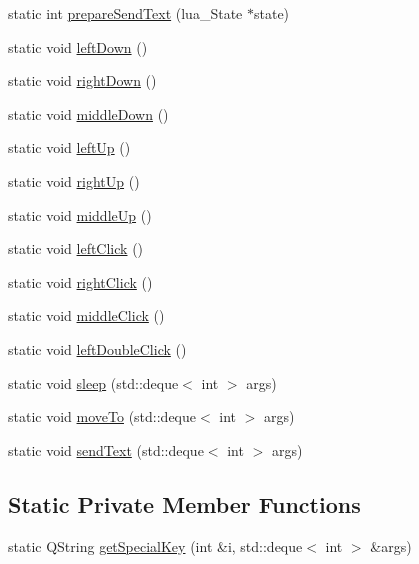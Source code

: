 \begin{DoxyCompactItemize}
\item 
static int \hyperlink{class_lua_api_engine_a8f327b5c6d5819c9078b53a665842c47}{prepare\-Send\-Text} (lua\-\_\-\-State $\ast$state)
\item 
static void \hyperlink{class_lua_api_engine_a5942498f999031601960d890b259536b}{left\-Down} ()
\item 
static void \hyperlink{class_lua_api_engine_a14df77fdabe3ddf5dd19c35e70acb2d8}{right\-Down} ()
\item 
static void \hyperlink{class_lua_api_engine_abea870a5edb171b0bc2345dd1e1e7b95}{middle\-Down} ()
\item 
static void \hyperlink{class_lua_api_engine_a926f72169c400bb32186737f03208e1c}{left\-Up} ()
\item 
static void \hyperlink{class_lua_api_engine_ae8b09733792cc95ca22654be8074bfbf}{right\-Up} ()
\item 
static void \hyperlink{class_lua_api_engine_a2cd4a53a99e262aa9d5e83a2b34b6538}{middle\-Up} ()
\item 
static void \hyperlink{class_lua_api_engine_ae857b39d951f50a206989c3422cb5494}{left\-Click} ()
\item 
static void \hyperlink{class_lua_api_engine_a7b3664b6f2593d3bd817edeee61a18e6}{right\-Click} ()
\item 
static void \hyperlink{class_lua_api_engine_a633c229323434db2d1af7f66c1517a34}{middle\-Click} ()
\item 
static void \hyperlink{class_lua_api_engine_a2004f3ce56fc785e0276491642e39e7a}{left\-Double\-Click} ()
\item 
static void \hyperlink{class_lua_api_engine_a6910c482ffa6327999b49504522991b7}{sleep} (std\-::deque$<$ int $>$ args)
\item 
static void \hyperlink{class_lua_api_engine_a8512ba309e37218b1586f8a41cae4451}{move\-To} (std\-::deque$<$ int $>$ args)
\item 
static void \hyperlink{class_lua_api_engine_a396ae61c3f7c771f5fe06584cef15169}{send\-Text} (std\-::deque$<$ int $>$ args)
\end{DoxyCompactItemize}
\subsection*{Static Private Member Functions}
\begin{DoxyCompactItemize}
\item 
static Q\-String \hyperlink{class_lua_api_engine_ae6514c96984b4c7eb3068c3a29648f69}{get\-Special\-Key} (int \&i, std\-::deque$<$ int $>$ \&args)
\end{DoxyCompactItemize}
